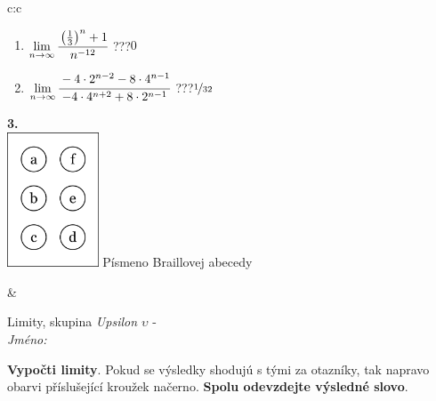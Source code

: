 \documentclass[10pt]{report}
\begin{document}
\begin{tabular}{c:c}
\begin{minipage}[c][104.5mm][t]{0.5\linewidth}
\begin{center}
\begin{minipage}{0.79\linewidth}
\begin{center}
\begin{varwidth}{\linewidth}
\begin{enumerate}
\item $\lim\limits_{n\to\infty}\cfrac{\left(\frac{1}{3}\right)^n +1}{n^{-12}}$\quad \dotfill\; ???\;\dotfill \quad $0$
\item $\lim\limits_{n\to\infty}\cfrac{-4\cdot 2^{n-2}-8\cdot 4^{n-1}}{-4\cdot 4^{n+2}+8\cdot 2^{n-1}}$\quad \dotfill\; ???\;\dotfill \quad $\nicefrac{1}{32}$
\end{enumerate}
\end{varwidth}
\end{center}
\end{minipage}
\begin{minipage}{0.20\linewidth}
\begin{center}
{\Huge\bfseries 3.} \\[2mm]
\includegraphics[height=40mm]{../images/braille.png}
{\small Písmeno Braillovej abecedy}
\end{center}
\end{minipage}
\end{center}
\end{minipage}
&
\begin{minipage}[c][104.5mm][t]{0.5\linewidth}
\begin{center}
\vspace{7mm}
{\huge Limity, skupina \textit{Upsilon $\upsilon$} -}\\[5mm]
\textit{Jméno:}\phantom{xxxxxxxxxxxxxxxxxxxxxxxxxxxxxxxxxxxxxxxxxxxxxxxxxxxxxxxxxxxxxxxxx}\\[5mm]
\begin{minipage}{0.95\linewidth}
\begin{center}
\textbf{Vypočti limity}. Pokud se výsledky shodujú s tými za otazníky, tak napravo\\obarvi příslušející kroužek načerno. \textbf{Spolu odevzdejte výsledné slovo}.
\end{center}
\end{minipage}
\\[1mm]
\begin{minipage}{0.79\linewidth}
\begin{center}
\begin{varwidth}{\linewidth}

\end{varwidth}
\end{center}
\end{minipage}
\end{center}
\end{minipage}
\end{tabular}
\end{document}

